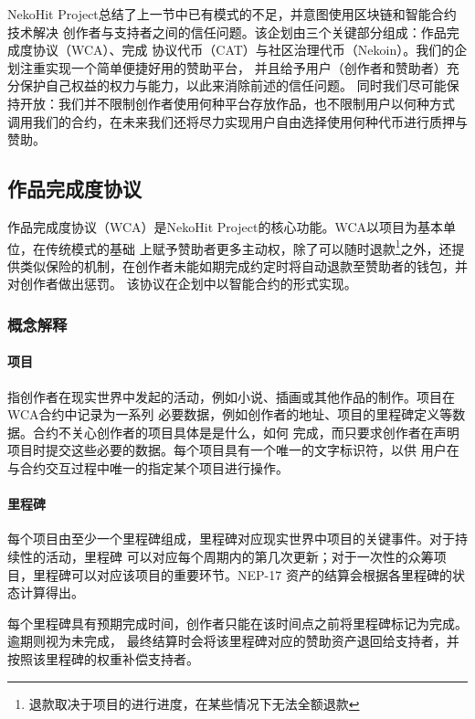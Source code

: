 NekoHit Project总结了上一节中已有模式的不足，并意图使用区块链和智能合约技术解决
创作者与支持者之间的信任问题。该企划由三个关键部分组成：作品完成度协议（WCA）、完成
协议代币（CAT）与社区治理代币（Nekoin）。我们的企划注重实现一个简单便捷好用的赞助平台，
并且给予用户（创作者和赞助者）充分保护自己权益的权力与能力，以此来消除前述的信任问题。
同时我们尽可能保持开放：我们并不限制创作者使用何种平台存放作品，也不限制用户以何种方式
调用我们的合约，在未来我们还将尽力实现用户自由选择使用何种代币进行质押与赞助。

\subsection{作品完成度协议}\label{subsec:wca}

作品完成度协议（WCA）是NekoHit Project的核心功能。WCA以项目为基本单位，在传统模式的基础
上赋予赞助者更多主动权，除了可以随时退款\footnote{
    退款取决于项目的进行进度，在某些情况下无法全额退款
}之外，还提供类似保险的机制，在创作者未能如期完成约定时将自动退款至赞助者的钱包，并对创作者做出惩罚。
该协议在企划中以智能合约的形式实现。

\subsubsection{概念解释}

\paragraph{项目}

指创作者在现实世界中发起的活动，例如小说、插画或其他作品的制作。项目在WCA合约中记录为一系列
必要数据，例如创作者的地址、项目的里程碑定义等数据。合约不关心创作者的项目具体是是什么，如何
完成，而只要求创作者在声明项目时提交这些必要的数据。每个项目具有一个唯一的文字标识符，以供
用户在与合约交互过程中唯一的指定某个项目进行操作。

\paragraph{里程碑}

每个项目由至少一个里程碑组成，里程碑对应现实世界中项目的关键事件。对于持续性的活动，里程碑
可以对应每个周期内的第几次更新；对于一次性的众筹项目，里程碑可以对应该项目的重要环节。NEP-17
资产的结算会根据各里程碑的状态计算得出。

每个里程碑具有预期完成时间，创作者只能在该时间点之前将里程碑标记为完成。逾期则视为未完成，
最终结算时会将该里程碑对应的赞助资产退回给支持者，并按照该里程碑的权重补偿支持者。

